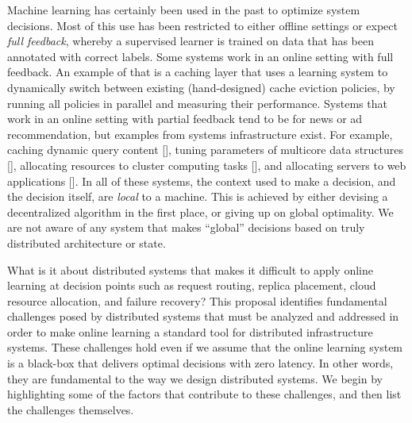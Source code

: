 \documentclass[a4paper,twocolumn]{article}
\begin{document}

Machine learning has certainly been used in the past to optimize system
decisions. Most of this use has been restricted to either offline settings or
expect {\em full feedback}, whereby a supervised learner is trained on data
that has been annotated with correct labels.
Some systems work in an online setting with full feedback. An example of that
is a caching layer that uses a learning system to dynamically switch between
existing (hand-designed) cache eviction policies, by running all policies in
parallel and measuring their performance.
Systems that work in an online setting with partial feedback
tend to be for news or ad recommendation, but examples from systems
infrastructure exist. For example, caching dynamic query content [], tuning
parameters of multicore data structures [], allocating resources to cluster
computing tasks [], and allocating servers to web applications [].  In all of
these systems, the context used to make a decision, and the decision itself, are
{\em local} to a machine. This is achieved by either devising a decentralized
algorithm in the first place, or giving up on global optimality. We are not
aware of any system that makes ``global'' decisions based on truly distributed
architecture or state.


What is it about distributed systems that makes it difficult to apply online
learning at decision points such as request routing, replica placement, cloud
resource allocation, and failure recovery? This proposal identifies fundamental
challenges posed by distributed systems that must be analyzed and addressed in
order to make online learning a standard tool for distributed infrastructure
systems.  These challenges hold even if we assume that the online learning
system is a black-box that delivers optimal decisions with zero latency. In
other words, they are fundamental to the way we design distributed systems.  We
begin by highlighting some of the factors that contribute to these challenges,
and then list the challenges themselves.
\end{document}

